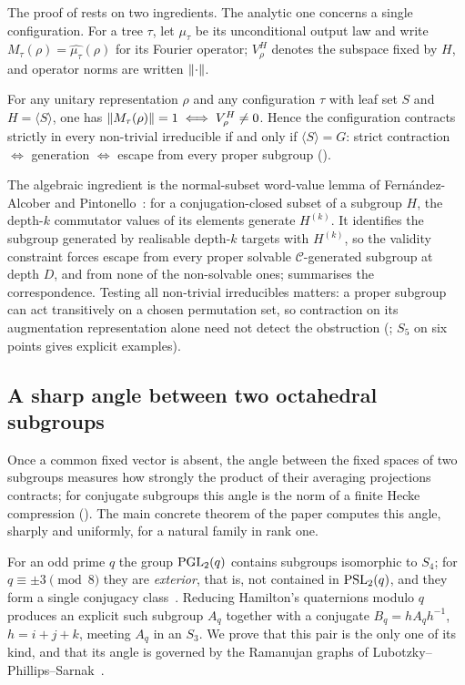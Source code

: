 The proof of  rests on two ingredients. The analytic one
concerns a single configuration. For a tree $\tau$, let $\mu_\tau$ be its
unconditional output law and write $M_\tau(\rho)=\widehat{\mu_\tau}(\rho)$
for its Fourier operator; $V_\rho^H$ denotes the subspace fixed by $H$,
and operator norms are written $\lVert \cdot \rVert$.

\begin{lettertheorem}
\label{ithm:B}
For any unitary representation $\rho$ and any configuration $\tau$ with leaf set $S$ and
$H=\langle S\rangle$, one has $\lVert M_\tau(\rho) \rVert=1\iff V_\rho^H\neq0$. Hence the
configuration contracts strictly in every non-trivial irreducible if and only if
$\langle S\rangle=G$: strict contraction $\iff$ generation $\iff$ escape from every proper
subgroup \textup{()}.
\end{lettertheorem}

The algebraic ingredient is the normal-subset word-value lemma of
Fern\'andez-Alcober and Pintonello~\cite[Lemma 2.1(ii)]{FernandezPintonello2023}:
for a conjugation-closed subset of a subgroup $H$, the depth-$k$
commutator values of its elements generate $H^{(k)}$. It identifies the
subgroup generated by realisable depth-$k$ targets with $H^{(k)}$, so the
validity constraint forces escape from every proper solvable
$\mathcal C$-generated subgroup at depth $D$, and from none of the
non-solvable ones;  summarises the correspondence.
Testing all non-trivial irreducibles matters: a proper subgroup can act
transitively on a chosen permutation set, so contraction on its
augmentation representation alone need not detect the obstruction
(; $S_5$ on six points gives explicit examples).

\subsection*{A sharp angle between two octahedral subgroups}
Once a common fixed vector is absent, the angle between the fixed spaces
of two subgroups measures how strongly the product of their averaging
projections contracts; for conjugate subgroups this angle is the norm of
a finite Hecke compression (). The main
concrete theorem of the paper computes this angle, sharply and uniformly,
for a natural family in rank one.

For an odd prime $q$ the group $\operatorname{PGL}_2(q)$ contains subgroups isomorphic
to $S_4$; for $q\equiv\pm3\pmod 8$ they are \emph{exterior}, that is, not
contained in $\operatorname{PSL}_2(q)$, and they form a single conjugacy
class~\cite{Huppert1967,King2005,Giudici2007}. Reducing Hamilton's
quaternions modulo $q$ produces an explicit such subgroup $A_q$ together
with a conjugate $B_q=hA_qh^{-1}$, $h=i+j+k$, meeting $A_q$ in an $S_3$.
We prove that this pair is the only one of its kind, and that its angle is
governed by the Ramanujan graphs of
Lubotzky--Phillips--Sarnak~\cite{LPS1988}.

